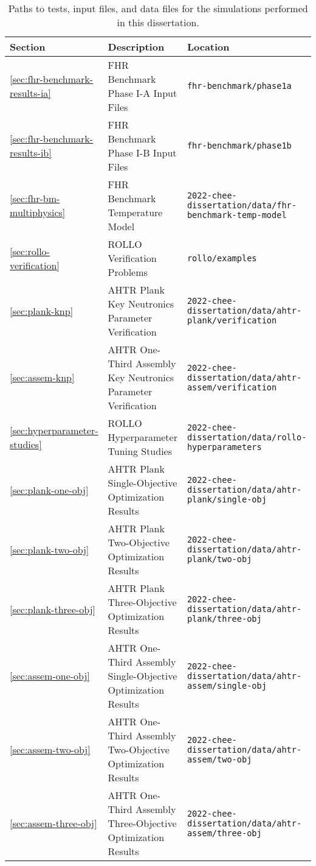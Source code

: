 \begin{landscape}
\begin{table}[htbp!]
    \centering
    \onehalfspacing
    \caption{Paths to tests, input files, and data files for the simulations performed 
    in this dissertation. }
    \label{tab:reproducibility}
    \begin{tabular}{p{2cm}p{9cm}p{11cm}}
    \toprule
    \textbf{Section} & \textbf{Description} & \textbf{Location} \\
    \midrule
    \ref{sec:fhr-benchmark-results-ia} & FHR Benchmark Phase I-A Input Files & 
    \texttt{fhr-benchmark/phase1a} \\ 
    \midrule
    \ref{sec:fhr-benchmark-results-ib} & FHR Benchmark Phase I-B Input Files & 
    \texttt{fhr-benchmark/phase1b} \\ 
    \midrule
    \ref{sec:fhr-bm-multiphysics} & FHR Benchmark Temperature Model & 
    \texttt{2022-chee-dissertation/data/fhr-benchmark-temp-model} \\ 
    \midrule
    \ref{sec:rollo-verification} & ROLLO Verification Problems & 
    \texttt{rollo/examples} \\ 
    \midrule
    \ref{sec:plank-knp} & AHTR Plank Key Neutronics Parameter Verification & 
    \texttt{2022-chee-dissertation/data/ahtr-plank/verification} \\
    \midrule
    \ref{sec:assem-knp} & AHTR One-Third Assembly Key Neutronics Parameter Verification & 
    \texttt{2022-chee-dissertation/data/ahtr-assem/verification} \\
    \midrule
    \ref{sec:hyperparameter-studies} & ROLLO Hyperparameter Tuning Studies & 
    \texttt{2022-chee-dissertation/data/rollo-hyperparameters} \\
    \midrule
    \ref{sec:plank-one-obj} & AHTR Plank Single-Objective Optimization Results & 
    \texttt{2022-chee-dissertation/data/ahtr-plank/single-obj} \\
    \midrule
    \ref{sec:plank-two-obj} & AHTR Plank Two-Objective Optimization Results & 
    \texttt{2022-chee-dissertation/data/ahtr-plank/two-obj} \\
    \midrule
    \ref{sec:plank-three-obj} & AHTR Plank Three-Objective Optimization Results & 
    \texttt{2022-chee-dissertation/data/ahtr-plank/three-obj} \\
    \midrule
    \ref{sec:assem-one-obj} & AHTR One-Third Assembly Single-Objective Optimization Results & 
    \texttt{2022-chee-dissertation/data/ahtr-assem/single-obj} \\
    \midrule
    \ref{sec:assem-two-obj} & AHTR One-Third Assembly Two-Objective Optimization Results & 
    \texttt{2022-chee-dissertation/data/ahtr-assem/two-obj} \\
    \midrule
    \ref{sec:assem-three-obj} & AHTR One-Third Assembly Three-Objective Optimization Results & 
    \texttt{2022-chee-dissertation/data/ahtr-assem/three-obj} \\
    \bottomrule
    \end{tabular}
\end{table}
\end{landscape}